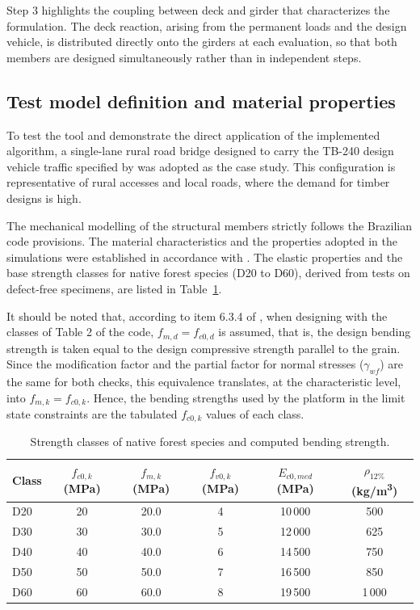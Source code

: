 Step 3 highlights the coupling between deck and girder that characterizes the formulation. The deck reaction, arising from the permanent loads and the design vehicle, is distributed directly onto the girders at each evaluation, so that both members are designed simultaneously rather than in independent steps.

\subsection{Test model definition and material properties}\label{sec:modelo_teste}

To test the tool and demonstrate the direct application of the implemented algorithm, a single-lane rural road bridge designed to carry the TB-240 design vehicle traffic specified by \textcite{nbr7188} was adopted as the case study.
This configuration is representative of rural accesses and local roads, where the demand for timber designs is high.

The mechanical modelling of the structural members strictly follows the Brazilian code provisions.
The material characteristics and the properties adopted in the simulations were established in accordance with \textcite{NBR7190-1:2022}.
The elastic properties and the base strength classes for native forest species (D20 to D60), derived from tests on defect-free specimens, are listed in Table~\ref{tab:classes_madeira}.

It should be noted that, according to item 6.3.4 of \textcite{NBR7190-1:2022}, when designing with the classes of Table 2 of the code, $f_{m,d} = f_{c0,d}$ is assumed, that is, the design bending strength is taken equal to the design compressive strength parallel to the grain.
Since the modification factor and the partial factor for normal stresses ($\gamma_{wf}$) are the same for both checks, this equivalence translates, at the characteristic level, into $f_{m,k} = f_{c0,k}$.
Hence, the bending strengths used by the platform in the limit state constraints are the tabulated $f_{c0,k}$ values of each class.

\begin{table}[!ht]
\caption{Strength classes of native forest species and computed bending strength.\label{tab:classes_madeira}}
\begin{threeparttable}
\footnotesize
\setlength{\tabcolsep}{3pt}
\begin{tabular*}{\columnwidth}{@{\extracolsep{\fill}}lccccc@{\extracolsep{\fill}}}
\toprule
Class & $f_{c0,k}$ (MPa) & $f_{m,k}$ (MPa) & $f_{v0,k}$ (MPa) & $E_{c0,med}$ (MPa) & $\rho_{12\%}$ (kg/m\textsuperscript{3}) \\
\midrule
D20 & 20 & 20.0 & 4 & 10\,000 & 500 \\
D30 & 30 & 30.0 & 5 & 12\,000 & 625 \\
D40 & 40 & 40.0 & 6 & 14\,500 & 750 \\
D50 & 50 & 50.0 & 7 & 16\,500 & 850 \\
D60 & 60 & 60.0 & 8 & 19\,500 & 1\,000 \\
\bottomrule
\end{tabular*}
\end{threeparttable}
\end{table}
